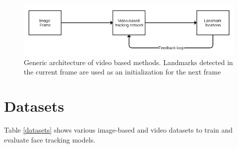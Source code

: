 \documentclass{llncs}
\begin{document}
\begin{figure}[h!]

\includegraphics[scale=0.5]{Media/generic_video_based}
\caption{Generic architecture of video based methods. Landmarks detected in the current frame are used as an initialization for the next frame}
\label{generic_video_based}
\end{figure}

\section{Datasets}

Table \textcolor{red}{\ref{datasets}} shows various image-based and video datasets to train and evaluate face tracking models.
\end{document}
